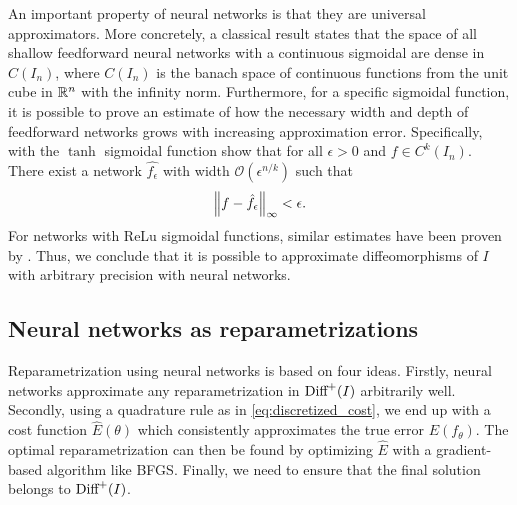 An important property of neural networks is that they are universal approximators. More concretely, a classical result \cite[Theorem 2]{cybenko1989} states that the space of all shallow feedforward neural networks with a continuous sigmoidal are dense in \(C(I_n)\), where \(C(I_n)\) is the banach space of continuous functions from the unit cube in \(\mathbb{R}^n\) with the infinity norm.  Furthermore, for a specific sigmoidal function, it is possible to prove an estimate of how the necessary width and depth of feedforward networks grows with increasing approximation error. Specifically, with the \(\tanh\) sigmoidal function \citeauthor{ryck2021} \cite[Theorem 5.1]{ryck2021} show that for all \(\epsilon > 0 \) and \(f \in C^k(I_n)\). There exist a network \(\hat{f_\epsilon}\) with width \(\mathcal{O}(\epsilon^{n / k})\) such that
\begin{equation}
  \norm{f - \hat{f_\epsilon}}_\infty < \epsilon.  
\end{equation} 
For networks with ReLu sigmoidal functions, similar estimates have been proven by \citeauthor{yarotsky2017} \cite{yarotsky2017}. Thus, we conclude that it is possible to approximate diffeomorphisms of \(I\) with arbitrary precision with neural networks.


\subsection{Neural networks as reparametrizations}\label{subsec:neural-nets}
Reparametrization using neural networks is based on four ideas. Firstly, neural networks approximate any reparametrization in \(\text{Diff}^+(I)\) arbitrarily well. Secondly, using a quadrature rule as in \eqref{eq:discretized_cost}, we end up with a cost function \(\hat E(\theta)\) which consistently approximates the true error \(E(f_\theta)\). The optimal reparametrization can then be found by optimizing \(\hat E\) with a gradient-based algorithm like BFGS\@. Finally, we need to ensure that the final solution belongs to \(\text{Diff}^+(I)\). 

